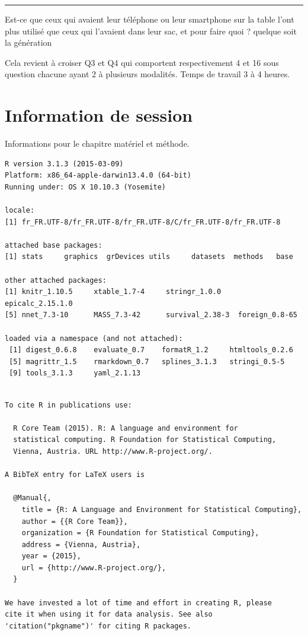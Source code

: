 \documentclass[]{article}
\begin{document}
\begin{center}\rule{3in}{0.4pt}\end{center}

Est-ce que ceux qui avaient leur téléphone ou leur smartphone sur la
table l'ont plus utilisé que ceux qui l'avaient dans leur sac, et pour
faire quoi ? quelque soit la génération

Cela revient à croiser Q3 et Q4 qui comportent respectivement 4 et 16
sous question chacune ayant 2 à plusieurs modalités. Temps de travail 3
à 4 heures.

\section{Information de session}\label{information-de-session}

Informations pour le chapitre matériel et méthode.

\begin{verbatim}
R version 3.1.3 (2015-03-09)
Platform: x86_64-apple-darwin13.4.0 (64-bit)
Running under: OS X 10.10.3 (Yosemite)

locale:
[1] fr_FR.UTF-8/fr_FR.UTF-8/fr_FR.UTF-8/C/fr_FR.UTF-8/fr_FR.UTF-8

attached base packages:
[1] stats     graphics  grDevices utils     datasets  methods   base     

other attached packages:
[1] knitr_1.10.5     xtable_1.7-4     stringr_1.0.0    epicalc_2.15.1.0
[5] nnet_7.3-10      MASS_7.3-42      survival_2.38-3  foreign_0.8-65  

loaded via a namespace (and not attached):
 [1] digest_0.6.8    evaluate_0.7    formatR_1.2     htmltools_0.2.6
 [5] magrittr_1.5    rmarkdown_0.7   splines_3.1.3   stringi_0.5-5  
 [9] tools_3.1.3     yaml_2.1.13    
\end{verbatim}

\begin{verbatim}

To cite R in publications use:

  R Core Team (2015). R: A language and environment for
  statistical computing. R Foundation for Statistical Computing,
  Vienna, Austria. URL http://www.R-project.org/.

A BibTeX entry for LaTeX users is

  @Manual{,
    title = {R: A Language and Environment for Statistical Computing},
    author = {{R Core Team}},
    organization = {R Foundation for Statistical Computing},
    address = {Vienna, Austria},
    year = {2015},
    url = {http://www.R-project.org/},
  }

We have invested a lot of time and effort in creating R, please
cite it when using it for data analysis. See also
'citation("pkgname")' for citing R packages.
\end{verbatim}
\end{document}
